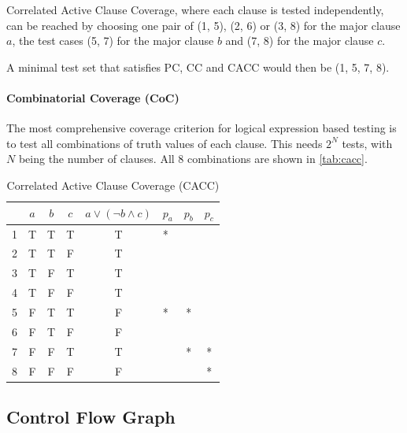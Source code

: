 \documentclass{scrreprt}
\begin{document}
Correlated Active Clause Coverage, where each clause is tested independently, can be reached by choosing one pair of (1, 5), (2, 6) or (3, 8) for the major clause $a$, the test cases (5, 7) for the major clause $b$ and (7, 8) for the major clause $c$.

A minimal test set that satisfies PC, CC and CACC would then be (1, 5, 7, 8).

\paragraph{Combinatorial Coverage (CoC)}

The most comprehensive coverage criterion for logical expression based testing is to test all combinations of truth values of each clause. This needs $2^N$ tests, with $N$ being the number of clauses. All 8 combinations are shown in \vref{tab:cacc}. 

\begin{table}[h]
	\centering
	\caption{\label{tab:cacc}Correlated Active Clause Coverage (CACC)}
	\begin{tabular}{r|ccc|c|l|c|c}
		   & $a$ & $b$ & $c$ & $a \lor (\lnot b \land c)$ & $p_a$ & $p_b$ & $p_c$ \\ \hline
		1 & T & T & T & T & *\quad\quad  &   &  \\
		2 & T & T & F & T & \quad*\quad  &   &  \\
		3 & T & F & T & T & \quad\quad*  &   &  \\
		4 & T & F & F & T &        &   &  \\
		5 & F & T & T & F & *\quad\quad  & * &  \\
		6 & F & T & F & F & \quad*\quad &   &  \\
		7 & F & F & T & T &        & * & *  \\
		8 & F & F & F & F & \quad\quad* &   & *  \\
	\end{tabular}
\end{table}

\subsection{Control Flow Graph}
\end{document}
